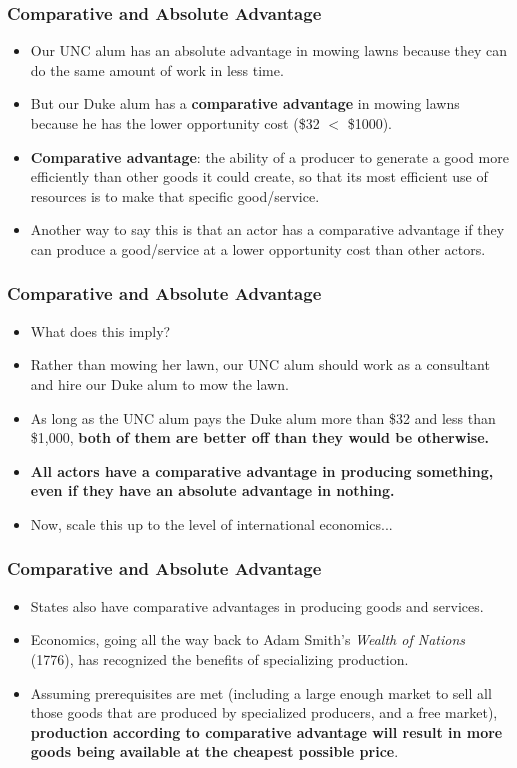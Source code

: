 \documentclass{beamer}
\begin{document}
\begin{frame} 
	\frametitle{\LARGE{Comparative and Absolute Advantage}}
	\begin{itemize}
		\item Our UNC alum has an absolute advantage in mowing lawns because they can do the same amount of work in less time.		
		\item But our Duke alum has a \textbf{comparative advantage} in mowing lawns because he has the lower opportunity cost (\$32 $<$ \$1000). \pause
		\item \textbf{Comparative advantage}: the ability of a producer to generate a good more efficiently than other goods it could create, so that its most efficient use of resources is to make that specific good/service. \pause 
		\item Another way to say this is that an actor has a comparative advantage if they can produce a good/service at a lower opportunity cost than other actors.
	\end{itemize}
\end{frame}

\begin{frame} 
	\frametitle{\LARGE{Comparative and Absolute Advantage}}
	\begin{itemize}
		\item What does this imply?
		\item Rather than mowing her lawn, our UNC alum should work as a consultant and hire our Duke alum to mow the lawn. \pause
		\item As long as the UNC alum pays the Duke alum more than \$32 and less than \$1,000, \textbf{both of them are better off than they would be otherwise.} \pause
		\item \textbf{All actors have a comparative advantage in producing something, even if they have an absolute advantage in nothing.} \pause
		\item Now, scale this up to the level of international economics...		
	\end{itemize}
\end{frame}

\begin{frame} 
	\frametitle{\LARGE{Comparative and Absolute Advantage}}
	\begin{itemize}
		\item States also have comparative advantages in producing goods and services.
		\item Economics, going all the way back to Adam Smith's \textit{Wealth of Nations} (1776), has recognized the benefits of specializing production. \pause
		\item Assuming prerequisites are met (including a large enough market to sell all those goods that are produced by specialized producers, and a free market), \textbf{production according to comparative advantage will result in more goods being available at the cheapest possible price}. 
	\end{itemize}
\end{frame}
\end{document}
